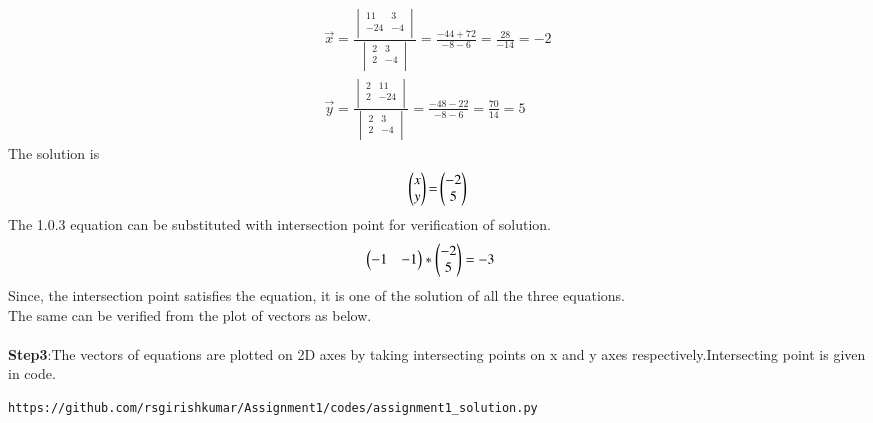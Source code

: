 \documentclass[journal,12pt,twocolumn]{IEEEtran}
\begin{document}
\begin{align*}
\vec{x}=\frac{\begin{vmatrix}11 & 3\\-24 & -4\\\end{vmatrix}}{\begin{vmatrix}2 & 3\\2 & -4\\\end{vmatrix}}=\frac{-44+72}{-8-6}=\frac{28}{-14}=-2\\
\vec{y}=\frac{\begin{vmatrix}2 & 11\\2 & -24\\\end{vmatrix}}{\begin{vmatrix}2 & 3\\2 & -4\\\end{vmatrix}}=\frac{-48-22}{-8-6}=\frac{70}{14}=5
\end{align*}
The solution is\\
\begin{align}
\begin{pmatrix}x\\y\end{pmatrix}\mathbf{=}\begin{pmatrix}-2\\5\end{pmatrix}
\end{align}
The 1.0.3 equation can be substituted with intersection point for verification of solution.
\begin{align*}
\begin{pmatrix}-1 & -1\end{pmatrix}&*\begin{pmatrix}-2\\5\end{pmatrix}=-3
\end{align*}
Since, the intersection point satisfies the equation, it is one of the solution of all the three equations.\\
The same can be verified from the plot of vectors as below.\\
\\
\textbf{Step3}:The vectors of equations are plotted on 2D axes by taking intersecting points on x and y axes respectively.Intersecting point is given in code.\\
\begin{lstlisting}
https://github.com/rsgirishkumar/Assignment1/codes/assignment1_solution.py
\end{lstlisting}
\end{document}
